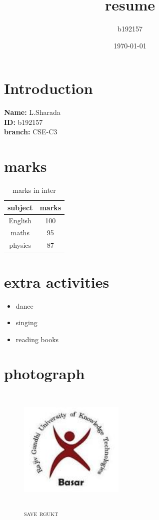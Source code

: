 \documentclass{article}
\title{resume}
\author{b192157}
\date{\today}
\begin{document}
\section{Introduction}
\textbf{Name:}
L.Sharada\\
\textbf{ID:}
b192157\\
\textbf{branch:}
CSE-C3\\
\section{marks}
\begin{table}[h]
    \centering
    \begin{tabular}{|c|c|}
        \hline
        \color{red}
        \textbf{subject} & \color{red} \textbf{marks}\\
        \hline
       \color{green} English &\color{green} 100 \\
        \hline
       \color{green} maths & \color{green}95\\
        \hline
        physics & 87\\
        \hline
    \end{tabular}
    \caption{marks in inter}
    \label{kernal}
\end{table}
\section{extra activities}
\begin{itemize}
  \color{blue}  
        \item dance\\
        \item singing\\
        \item reading books
\end{itemize}
\section{photograph}
\begin{figure}
    \centering
    \includegraphics[width=5cm,height=6cm]{r.jpeg}
    \caption{\textsc{save rgukt}}
    
\end{figure}
\end{document}
